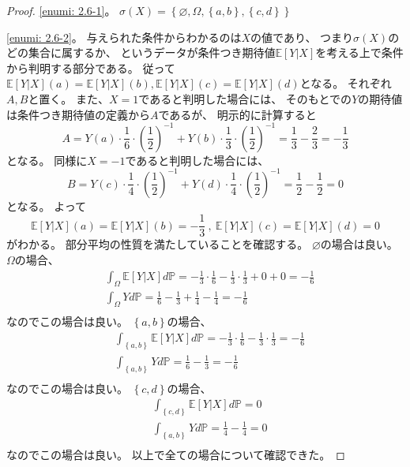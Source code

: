\documentclass[uplatex]{jsarticle}
\theoremstyle{definition}
\renewcommand{\emptyset}{\varnothing}
\def\P{\mathbb{P}}
\def\E{\mathbb{E}}
\begin{document}
\begin{proof}
  \ref{enumi: 2.6-1}。
  \(
  \sigma(X) = \left\{ \emptyset, \Omega,
  \left\{ a,b\right\}, \left\{ c,d\right\}\right\}
  \)

  \ref{enumi: 2.6-2}。
  与えられた条件からわかるのは\(X\)の値であり、
  つまり\(\sigma(X)\)のどの集合に属するか、
  というデータが条件つき期待値\(\E[Y|X]\)を考える上で条件から判明する部分である。
  従って\(\E[Y|X](a)=\E[Y|X](b) , \E[Y|X](c)=\E[Y|X](d)\)となる。
  それぞれ\(A,B\)と置く。
  また、\(X=1\)であると判明した場合には、
  そのもとでの\(Y\)の期待値は条件つき期待値の定義から\(A\)であるが、
  明示的に計算すると
  \[
  A = Y(a)\cdot \frac{1}{6}\cdot (\frac{1}{2})^{-1}
  + Y(b)\cdot \frac{1}{3}\cdot (\frac{1}{2})^{-1}
  = \frac{1}{3} - \frac{2}{3} = -\frac{1}{3}
  \]
  となる。
  同様に\(X=-1\)であると判明した場合には、
  \[
  B = Y(c)\cdot \frac{1}{4}\cdot (\frac{1}{2})^{-1}
  + Y(d)\cdot \frac{1}{4}\cdot (\frac{1}{2})^{-1}
  = \frac{1}{2} - \frac{1}{2} = 0
  \]
  となる。
  よって
  \[
  \E[Y|X](a) = \E[Y|X](b) = -\frac{1}{3} \ , \
  \E[Y|X](c) = \E[Y|X](d) = 0
  \]
  がわかる。
  部分平均の性質を満たしていることを確認する。
  \(\emptyset\)の場合は良い。\(\Omega\)の場合、
  \begin{align*}
    &\int_{\Omega}\E[Y|X]d\P
    = -\frac{1}{3}\cdot \frac{1}{6}
    -\frac{1}{3}\cdot \frac{1}{3} + 0 + 0
    = -\frac{1}{6} \\
    &\int_{\Omega}Yd\P
    = \frac{1}{6}
    - \frac{1}{3} + \frac{1}{4} - \frac{1}{4}
    = -\frac{1}{6} \\
  \end{align*}
  なのでこの場合は良い。
  \(\left\{a,b\right\}\)の場合、
  \begin{align*}
    &\int_{\left\{a,b\right\}}\E[Y|X]d\P
    = -\frac{1}{3}\cdot \frac{1}{6}
    -\frac{1}{3}\cdot \frac{1}{3}
    = -\frac{1}{6} \\
    &\int_{\left\{a,b\right\}}Yd\P
    = \frac{1}{6}
    - \frac{1}{3}
    = -\frac{1}{6} \\
  \end{align*}
  なのでこの場合は良い。
  \(\left\{c,d\right\}\)の場合、
  \begin{align*}
    &\int_{\left\{c,d\right\}}\E[Y|X]d\P
    = 0 \\
    &\int_{\left\{a,b\right\}}Yd\P
    = \frac{1}{4}
    - \frac{1}{4}
    = 0 \\
  \end{align*}
  なのでこの場合は良い。
  以上で全ての場合について確認できた。


\end{proof}
\end{document}
